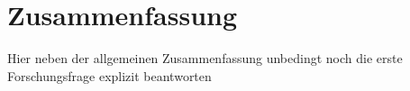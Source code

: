 \chapter{Zusammenfassung}\label{ch:zusammenfassung}

Hier neben der allgemeinen Zusammenfassung unbedingt noch die erste Forschungsfrage explizit beantworten